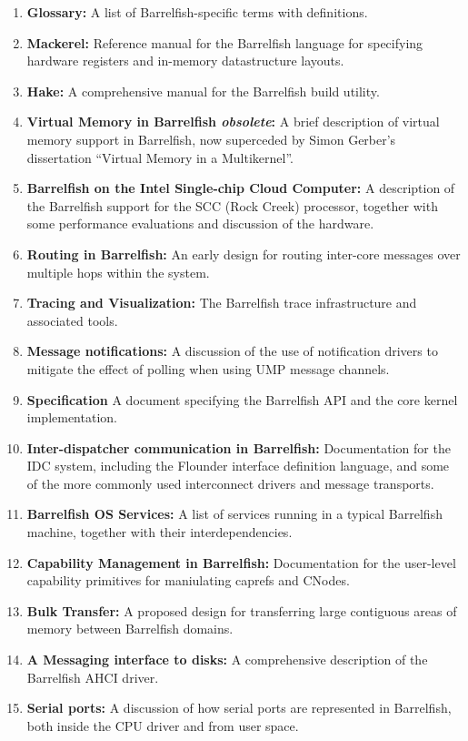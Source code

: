 \documentclass[a4paper,twoside]{report} %
\begin{document}
\begin{enumerate}
\item \textbf{Glossary:} A list of Barrelfish-specific terms with
  definitions. 
\item \textbf{Mackerel:} Reference manual for the Barrelfish language
  for specifying hardware registers and in-memory datastructure
  layouts. 
\item \textbf{Hake:} A comprehensive manual for the Barrelfish build
  utility. 
\item \textbf{Virtual Memory in Barrelfish \textit{obsolete}:} A brief
  description of virtual memory support in Barrelfish, now superceded
  by Simon Gerber's dissertation ``Virtual Memory in a Multikernel''. 
\item \textbf{Barrelfish on the Intel Single-chip Cloud Computer:} A
  description of the Barrelfish support for the SCC (Rock Creek)
  processor, together with some performance evaluations and discussion
  of the hardware. 
\item \textbf{Routing in Barrelfish:} An early design for routing
  inter-core messages over multiple hops within the system.
\item \textbf{Tracing and Visualization:} The Barrelfish trace
  infrastructure and associated tools.
\item \textbf{Message notifications:} A discussion of the use of notification
  drivers to mitigate the effect of polling when using UMP message
  channels. 
\item \textbf{Specification} A document specifying the Barrelfish API and the core kernel implementation.
\item \textbf{Inter-dispatcher communication in Barrelfish:}
  Documentation for the IDC system, including the Flounder interface
  definition language, and some of the more commonly used interconnect
  drivers and message transports.
\item \textbf{Barrelfish OS Services:} A list of services running in a
  typical Barrelfish machine, together with their interdependencies.
\item \textbf{Capability Management in Barrelfish:} Documentation
  for the user-level capability primitives for maniulating caprefs and
  CNodes. 
\item \textbf{Bulk Transfer:} A proposed design for transferring large
  contiguous areas of memory between Barrelfish domains.
\item \textbf{A Messaging interface to disks:} A comprehensive
  description of the Barrelfish AHCI driver. 
\item \textbf{Serial ports:} A discussion of how serial ports are
  represented in Barrelfish, both inside the CPU driver and from user
  space. 
\end{enumerate}
\end{document}
